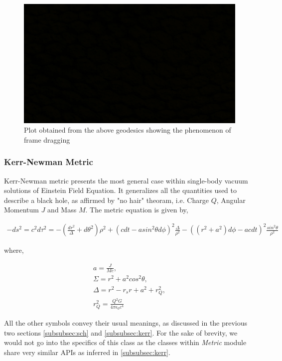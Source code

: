 \documentclass{aastex63}
\begin{document}
\begin{figure}[h]
	\centering
	\includegraphics[scale=0.1]{images/blank.jpg} %
	\caption{Plot obtained from the above geodesics showing the phenomenon of frame dragging}
	\label{fig:kerr}
\end{figure}


\subsubsection{Kerr-Newman Metric}\label{subsubsec:kerrnewman}
Kerr-Newman metric presents the most general case within single-body vacuum solutions of Einstein Field Equation. It generalizes all the quantities used to describe a black hole, as affirmed by "no hair" theoram, i.e. Charge $Q$, Angular Momentum $J$ and Mass $M$. The metric equation is given by,

\begin{gather}
-ds^2 = c^2 d\tau^2 = -(\frac{dr^2}{\Delta}+d\theta^2)\rho^2 + (c dt - a sin^2 \theta d\phi)^2 \frac{\Delta}{\rho^2} - ((r^2 + a^2)d\phi - ac dt)^2 \frac{sin^2 \theta}{\rho^2}
\end{gather}

where,

\begin{gather}
a = \frac{J}{Mc}, \nonumber \\
\Sigma = r^2 + a^2 cos^2 \theta , \nonumber  \\
\Delta  = r^2 - r_s r + a^2 + r_Q ^ 2, \nonumber \\
r_Q ^ 2 = \frac{Q^2 G}{4\pi\epsilon_0 c^4} \nonumber
\end{gather}

All the other symbols convey their usual meanings, as discussed in the previous two sections \ref{subsubsec:sch} and \ref{subsubsec:kerr}. For the sake of brevity, we would not go into the specifics of this class as the classes within \textit{Metric} module share very similar APIs as inferred in \ref{subsubsec:kerr}.
\end{document}
